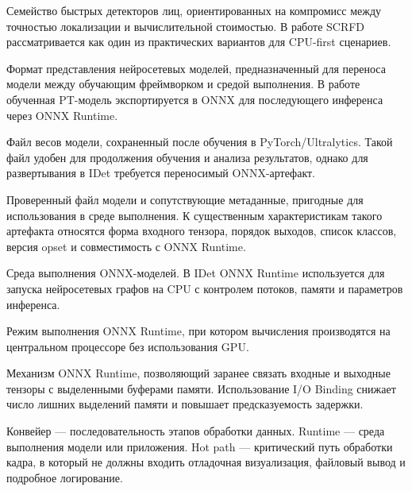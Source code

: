 \documentclass[12pt,a4paper,oneside,openany]{report}
\begin{document}
\begin{description}[style=nextline,leftmargin=1.25cm,labelsep=0.5em]
  \item[SCRFD]
      Семейство быстрых детекторов лиц, ориентированных на компромисс между точностью
      локализации и вычислительной стоимостью. В работе SCRFD рассматривается как один из
      практических вариантов для CPU-first сценариев.

  \item[ONNX]
      Формат представления нейросетевых моделей, предназначенный для переноса модели между
      обучающим фреймворком и средой выполнения. В работе обученная PT-модель экспортируется
      в ONNX для последующего инференса через ONNX Runtime.

  \item[PT-модель, checkpoint]
      Файл весов модели, сохраненный после обучения в PyTorch/Ultralytics. Такой файл удобен
      для продолжения обучения и анализа результатов, однако для развертывания в IDet требуется
      переносимый ONNX-артефакт.

  \item[Артефакт развертывания]
      Проверенный файл модели и сопутствующие метаданные, пригодные для использования в среде
      выполнения. К существенным характеристикам такого артефакта относятся форма входного
      тензора, порядок выходов, список классов, версия opset и совместимость с ONNX Runtime.

  \item[ONNX Runtime]
      Среда выполнения ONNX-моделей. В IDet ONNX Runtime используется для запуска нейросетевых
      графов на CPU с контролем потоков, памяти и параметров инференса.

  \item[CPU Execution Provider]
      Режим выполнения ONNX Runtime, при котором вычисления производятся на центральном
      процессоре без использования GPU.

  \item[I/O Binding]
      Механизм ONNX Runtime, позволяющий заранее связать входные и выходные тензоры с выделенными
      буферами памяти. Использование I/O Binding снижает число лишних выделений памяти и повышает
      предсказуемость задержки.

  \item[Конвейер, runtime, hot path]
      Конвейер --- последовательность этапов обработки данных. Runtime --- среда выполнения
      модели или приложения. Hot path --- критический путь обработки кадра, в который не должны
      входить отладочная визуализация, файловый вывод и подробное логирование.


\end{description}
\end{document}
